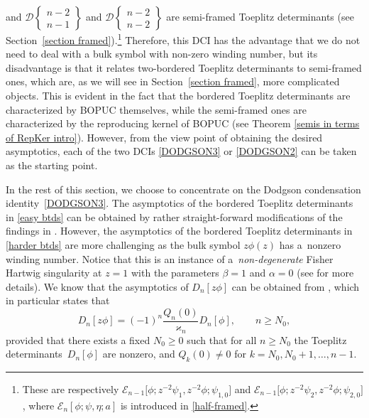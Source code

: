 \documentclass[10pt,a4paper]{amsart}
\numberwithin{equation}{section}
\newcommand{\al}{\alpha}
\newcommand{\be}{\beta}
\begin{document}
\begin{Remark}
		and $\mathscr{D}\left\lbrace \begin{smallmatrix} n-2 \\ n-1 \end{smallmatrix} \right\rbrace$ and $ \mathscr{D}\left\lbrace \begin{smallmatrix} n-2 \\ n-2 \end{smallmatrix} \right\rbrace$ are semi-framed Toeplitz determinants (see Section~\ref{section framed}).\footnote{These are respectively $\mathscr{E}_{n-1}\big[\phi;z^{-2}\psi_1,z^{-2}\phi;\psi_{1,0}\big]$ and $\mathscr{E}_{n-1}\big[\phi;z^{-2}\psi_2,z^{-2}\phi;\psi_{2,0}\big]$, where $\mathscr{E}_n[\phi;\psi,\eta;a]$ is introduced in \eqref{half-framed}.}	Therefore, this DCI has the advantage that we do not need to deal with a bulk symbol with non-zero winding number, but its disadvantage is that it relates two-bordered Toeplitz determinants to semi-framed ones, which are, as we will see in Section~\ref{section framed}, more complicated objects. This is evident in the fact that the bordered Toeplitz determinants are characterized by BOPUC themselves, while the semi-framed ones are characterized by the reproducing kernel of BOPUC (see Theorem \ref{semis in terms of RepKer intro}). However, from the view point of obtaining the desired asymptotics, each of the two DCIs \eqref{DODGSON3} or \eqref{DODGSON2} can be taken as the starting point.
\end{Remark}
	
In the rest of this section, we choose to concentrate on the Dodgson condensation identity~\eqref{DODGSON3}. The asymptotics of the bordered Toeplitz determinants in \eqref{easy btds} can be obtained by rather straight-forward modifications of the findings in \cite{BEGIL}. However, the asymptotics of the bordered Toeplitz determinants in \eqref{harder btds} are more challenging as the bulk symbol $z \phi(z)$ has a~nonzero winding number. Notice that this is an instance of a~\textit{non-degenerate} Fisher Hartwig singularity at $z=1$ with the parameters $\be=1$ and $\al=0$ (see \cite{DIK} for more details). We know that the asymptotics of $D_n[z \phi]$ can be obtained from \cite[Lemma 2.4]{DIK}, which in particular states that
	\begin{equation}\label{DIK zphi}
		D_n[z \phi] = (-1)^n \frac{Q_n(0)}{\varkappa_n}D_n[\phi], \qquad n \geq N_0,
	\end{equation}
	provided that there exists a fixed $N_0 \geq 0$ such that for all $n \geq N_0$ the Toeplitz determinants~$D_n[\phi]$ are nonzero, and $Q_k(0) \neq 0$ for $k=N_0, N_0+1, \dots, n-1$.
	
\end{document}
